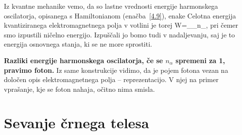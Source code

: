 Iz kvantne mehanike vemo, da so lastne vrednosti energije harmonskega oscilatorja, 
opisanega s Hamiltonianom (enačba~\ref{4.9}), enake
Celotna energija kvantiziranega elektromagnetnega polja v votlini
je torej 
\beq
W=\sum_{\alpha}\hbar\omega_{\alpha}n_{\alpha},
\eeq
pri čemer smo izpustili ničelno energijo. Izpuščali jo bomo tudi v nadaljevanju, saj
je to energija osnovnega stanja, ki se ne more sprostiti. 


{\bf Razliki energije harmonskega oscilatorja, če se $n_{\alpha}$
spremeni za 1, pravimo foton.} Iz same konstrukcije vidimo,
da je pojem fotona vezan na določen opis elektromagnetnega polja --
reprezentacijo. V njej na primer vprašanje, kje se foton nahaja, očitno
nima smisla.


\section{Sevanje črnega telesa}

